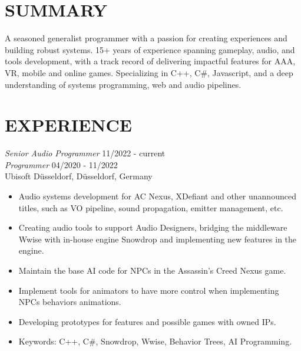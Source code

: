 \documentclass[line,margin]{res}
\begin{document}

\address{Düsseldorf - Germany}
\address{bruno@croci.me - \href{https://bruno.croci.me/}{https://bruno.croci.me/}}

 
\begin{resume}
 
  \section{SUMMARY} A seasoned generalist programmer with a passion for creating experiences and building robust systems. 15+ years of experience spanning gameplay, audio, and tools development, with a track record of delivering impactful features for AAA, VR, mobile and online games. Specializing in C++, C\#, Javascript, and a deep understanding of systems programming, web and audio pipelines.
 
\section{EXPERIENCE} 
        {\sl Senior Audio Programmer} \hfill 11/2022 - current \\
        {\sl Programmer} \hfill 04/2020 - 11/2022 \\
                Ubisoft Düsseldorf, Düsseldorf, Germany
        \begin{itemize}  \itemsep 1.25pt
            \item Audio systems development for AC Nexus, XDefiant and other unannounced titles, such as VO pipeline, sound propagation, emitter management, etc.
            \item Creating audio tools to support Audio Designers, bridging the middleware Wwise with in-house engine Snowdrop and implementing new features in the engine.
            \item Maintain the base AI code for NPCs in the Assassin's Creed Nexus game.
            \item Implement tools for animators to have more control when implementing NPCs behaviors animations.
            \item Developing prototypes for features and possible games with owned IPs.
            \item Keywords: C++, C\#, Snowdrop, Wwise, Behavior Trees, AI Programming.
        \end{itemize}


\end{resume}
\end{document}
